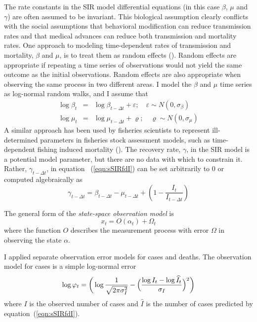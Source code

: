 \documentclass[12pt,letterpaper]{article}
\begin{document}
The rate constants in the SIR model differential equations (in this
case $\beta$, $\mu$ and $\gamma$) are often assumed to be invariant.
This biological assumption clearly conflicts with the social
assumptions
that behavioral modification can reduce transmission rates and
that medical advances can reduce both transmission and mortality
rates.
One approach to modeling time-dependent rates of transmission and
mortality, $\beta$ and $\mu$, is to treat them as random effects
(\cite{Skaug2006}). Random effects are appropriate if repeating a time
series of observations would not yield the same outcome as the initial
observations. Random effects are also appropriate when observing
the same process in two different areas. I model the  $\beta$ and
$\mu$ time series as log-normal random walks, and I assume that
\begin{eqnarray}
\log\beta_t &=& \log\beta_{t-\Delta t}+\varepsilon;\quad \varepsilon\sim 
N(0,\sigma_\beta)\\
\log\mu_t &=& \log\mu_{t-\Delta t}+\varrho;\quad \varrho\sim
N(0,\sigma_\mu)
\end{eqnarray}
A similar approach has been used by fisheries scientists to represent
ill-determined parameters in fisheries stock assessment models, such
as time-dependent fishing induced mortality
(\cite{Nielsen2014b,Sibert2017}).
The recovery rate, $\gamma$, in the SIR model is a potential model
parameter, but there are no data with which to constrain it.
Rather, $\gamma_{t-\Delta t}$, in equation~
(\ref{eqn:sSIRfdI}) can be set arbitrarily to 0 or computed algebraically as
\begin{equation}
\label{eqn:gamma}
\gamma_{t-\Delta t} = \beta_{t-\Delta t} - \mu_{t-\Delta t} +
(1-\frac{I_t}{I_{t-\Delta t}})
\end{equation}

The general form of the {\itshape state-space observation model} is
\begin{equation}
x_t = O(\alpha_t) + \Omega_t
\end{equation}
where the function $O$ describes the measurement process with
error $\Omega$ in observing the state $\alpha$.

I applied separate observation error models for cases and
deaths. The observation model for cases is a simple log-normal error
\begin{equation}
\label{eqn:logNlike}
\log\varphi_t = \bigg(\log\frac{1}{\sqrt{2\pi\sigma^2_I}} -\Bigl(\frac{\log
I_t-\log\widehat{I}_t}{\sigma_I}\Bigr)^2\bigg)\\
\end{equation}
where $I$ is the observed number of cases and $\widehat{I}$ is the
number of cases predicted by equation~(\ref{eqn:sSIRfdI}).
\end{document}
